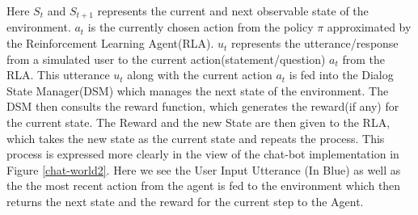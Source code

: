 \documentclass[14pt]{extarticle}
\numberwithin{equation}{section}
\begin{document}
	Here $S_t$ and $S_{t+1}$ represents the current and next observable state of the environment. $a_t$ is the currently chosen action from the policy $\pi$ approximated by the Reinforcement Learning Agent(RLA). $u_t$ represents the utterance/response from a simulated user to the current action(statement/question) $a_t$ from the RLA. This utterance $u_t$ along with the current action $a_t$ is fed into the Dialog State Manager(DSM) which manages the next state of the environment. The DSM then consults the reward function, which generates the reward(if any) for the current state. The Reward and the new State are then given to the RLA, which takes the new state as the current state and repeats the process. This process is expressed more clearly in the view of the chat-bot implementation in Figure \ref{chat-world2}. Here we see the User Input Utterance (In Blue) as well as the the most recent action from the agent is fed to the environment which then returns the next state and the reward for the current step to the Agent.
\end{document}

